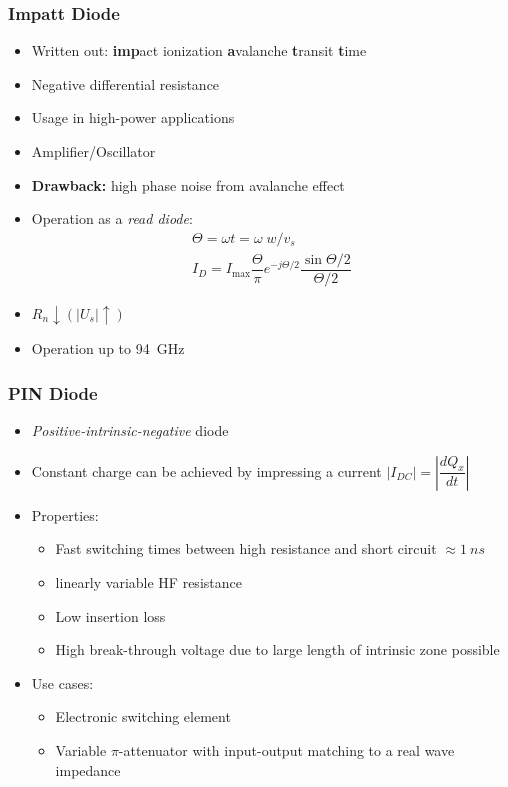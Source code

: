 \subsubsection{Impatt Diode}
\begin{itemize}
    \itemsep0pt
    \item Written out: \textbf{imp}act ionization \textbf{a}valanche \textbf{t}ransit \textbf{t}ime
    \item Negative differential resistance
    \item Usage in high-power applications
    \item Amplifier/Oscillator
    \item \textbf{Drawback:} high phase noise from avalanche effect
    \item Operation as a \textit{read diode}:
        \begin{align*}
            \Theta = \omega t = \omega \; w/v_s\\
            I_D = I_{\mathrm{max}} \dfrac{\Theta}{\pi} e^{-j\Theta/2} \dfrac{\sin\Theta/2}{\Theta/2}
        \end{align*}
    \item \(R_n \downarrow \left(|U_s|\uparrow\right)\)
    \item Operation up to \SI{94}{GHz}
\end{itemize}

\subsubsection{PIN Diode}
\begin{itemize}
    \itemsep0pt
    \item \textit{Positive-intrinsic-negative} diode
    \item Constant charge can be achieved by impressing a current \(|I_{DC}| = \left|\dfrac{dQ_x}{dt}\right|\)
    \item Properties:
        \begin{itemize}
            \itemsep0pt
            \item Fast switching times between high resistance and short circuit \(\approx \SI{1}{ns}\)
            \item linearly variable HF resistance
            \item Low insertion loss
            \item High break-through voltage due to large length of intrinsic zone possible
        \end{itemize}
    \item Use cases:
        \begin{itemize}
            \itemsep0pt
            \item Electronic switching element
            \item Variable $\pi$-attenuator with input-output matching to a real wave impedance
        \end{itemize}
\end{itemize}


